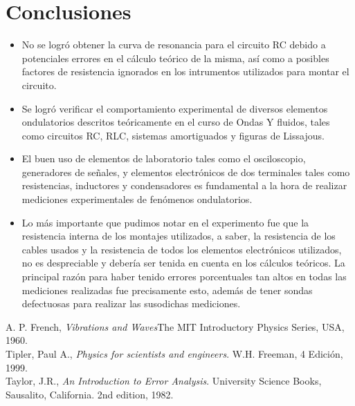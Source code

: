 \documentclass[prb,aps,twocolumn,preprintnumbers,amsmath,amssymb]{revtex4}
\begin{document}
\section{Conclusiones}

\begin{itemize}

	\item No se logró obtener la curva de resonancia para el circuito RC debido a potenciales errores en el cálculo teórico de la misma, así como a posibles factores de resistencia ignorados en los intrumentos utilizados para montar el circuito.
	
	\item Se logró verificar el comportamiento experimental de diversos elementos ondulatorios descritos teóricamente en el curso de Ondas Y fluidos, tales como circuitos RC, RLC, sistemas amortiguados y figuras de Lissajous.
		
	\item El buen uso de elementos de laboratorio tales como el osciloscopio, generadores de señales, y elementos electrónicos de dos terminales tales como resistencias, inductores y condensadores es fundamental a la hora de realizar mediciones experimentales de fenómenos ondulatorios.
	
	\item Lo más importante que pudimos notar en el experimento fue que la resistencia interna de los montajes utilizados, a saber, la resistencia de los cables usados y la resistencia de todos los elementos electrónicos utilizados, no es despreciable y debería ser tenida en cuenta en los cálculos teóricos. La principal razón para haber tenido errores porcentuales tan altos en todas las mediciones realizadas fue precisamente esto, además de tener sondas defectuosas para realizar las susodichas mediciones.
	
\end{itemize}

\begin{thebibliography}{99}
 A. P. French, {\it Vibrations and Waves}{The MIT Introductory Physics Series, USA, 1960}.\\
 Tipler, Paul A., \textit{Physics for scientists and engineers}. W.H. Freeman, 4 Edici\' on, 1999.\\
 Taylor, J.R., \textit{An Introduction to Error Analysis}. University Science Books, Sausalito, California. 2nd edition, 1982.\\
\end{thebibliography}
\end{document}
